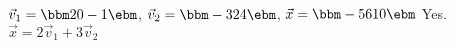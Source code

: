 {$\vec{v}_1 = \bbm 2\\0\\-1\ebm$, $\vec{v}_2 = \bbm -3\\2\\4\ebm$, $\vec{x} = \bbm -5\\6\\10\ebm$}
{Yes. $\vec x = 2\vec{v}_1+3\vec{v}_2$}